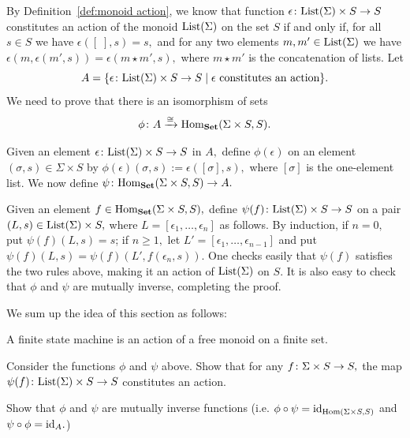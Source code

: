 \documentclass[CT4S-EN-RU]{subfiles}
\begin{document}
\begin{proofENG}
By Definition~\ref{def:monoid action}, we know that function $\epsilon\colon\textnormal{List}(\Sigma)\times S\rightarrow S$ constitutes an action of the monoid $\textnormal{List}(\Sigma)$ on the set $S$ if and only if, for all $s\in S$ we have $\epsilon([\;],s)=s,$ and for any two elements $m,m'\in\textnormal{List}(\Sigma)$ we have $\epsilon(m,\epsilon(m',s))=\epsilon(m\star m',s),$ where $m\star m'$ is the concatenation of lists. Let $$A=\{\epsilon\colon \textnormal{List}(\Sigma)\times S\rightarrow S{\;|\;}\epsilon\textnormal{ constitutes an action}\}.$$ We need to prove that there is an isomorphism of sets $$\phi\colon A\xrightarrow{\cong}\textnormal{Hom}_{\mathbf{Set}}(\Sigma\times S,S).$$

Given an element $\epsilon\colon\textnormal{List}(\Sigma)\times S\rightarrow S$ in $A,$ define $\phi(\epsilon)$ on an element $(\sigma,s)\in\Sigma\times S$ by $\phi(\epsilon)(\sigma,s):=\epsilon([\sigma],s),$ where $[\sigma]$ is the one-element list. We now define $\psi\colon\textnormal{Hom}_{\mathbf{Set}}(\Sigma\times S,S)\rightarrow A.$

Given an element $f\in\textnormal{Hom}_{\mathbf{Set}}(\Sigma\times S,S),$ define $\psi(f)\colon\textnormal{List}(\Sigma)\times S\rightarrow S$ on a pair $(L,s)\in\textnormal{List}(\Sigma)\times S,$ where $L=[\epsilon_1,\ldots,\epsilon_n]$ as follows. By induction, if $n=0,$ put $\psi(f)(L,s)=s$; if $n\geq 1,$ let $L'=[\epsilon_1,\ldots,\epsilon_{n-1}]$ and put $\psi(f)(L,s)=\psi(f)(L',f(\epsilon_n,s)).$ One checks easily that $\psi(f)$ satisfies the two rules above, making it an action of $\textnormal{List}(\Sigma)$ on $S.$ It is also easy to check that $\phi$ and $\psi$ are mutually inverse, completing the proof.
\end{proofENG}

\begin{proofRUS}
\end{proofRUS}

\begin{blockENG}
We sum up the idea of this section as follows:
\begin{sloganENG}
A finite state machine is an action of a free monoid on a finite set.
\end{sloganENG}
\end{blockENG}

\begin{blockRUS}
\end{blockRUS}

\begin{exerciseENG}
Consider the functions $\phi$ and $\psi$ above.
\sexc Show that for any $f\colon\Sigma\times S\rightarrow S,$ the map $\psi(f)\colon\textnormal{List}(\Sigma)\times S\rightarrow S$ constitutes an action.
\item Show that $\phi$ and $\psi$ are mutually inverse functions (i.e. $\phi\circ\psi=\textnormal{id}_{\textnormal{Hom}(\Sigma\times S,S)}$ and $\psi\circ\phi=\textnormal{id}_{A}.$)
\endsexc
\end{exerciseENG}
\end{document}
